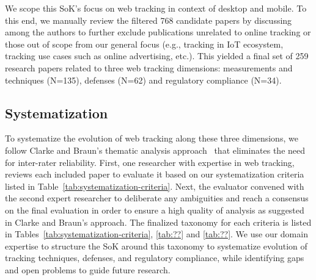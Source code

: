 %
We scope this SoK's focus on web tracking in context of desktop and mobile. 
%
To this end, we manually review the filtered 768 candidate papers by discussing among the authors to further exclude publications unrelated to online tracking or those out of scope from our general focus (e.g., tracking in IoT ecosystem, tracking use cases such as online advertising, etc.). 
%
This yielded a final set of 259 research papers related to three web tracking dimensions: measurements and techniques (N=135), defenses (N=62) and regulatory compliance (N=34).


\subsection{Systematization}
% 
To systematize the evolution of web tracking along these three dimensions, we follow Clarke and Braun’s thematic analysis approach~\cite{clarke2013successful} that eliminates the need for inter-rater reliability. 
%
First, one researcher with expertise in web tracking, reviews each included paper to evaluate it based on our systematization criteria listed in Table~\ref{tab:systematization-criteria}. 
%
Next, the evaluator convened with the second expert researcher to deliberate any ambiguities and reach
a consensus on the final evaluation in order to ensure a high quality of analysis as suggested in Clarke and Braun’s approach.
%
The finalized taxonomy for each criteria is listed in Tables~\ref{tab:systematization-criteria}, \ref{tab:??} and \ref{tab:??}.
%
% 
%
We use our domain expertise to structure the SoK around this taxonomy to systematize evolution of tracking techniques, defenses, and regulatory compliance, while identifying gaps and open problems to guide future research. 

